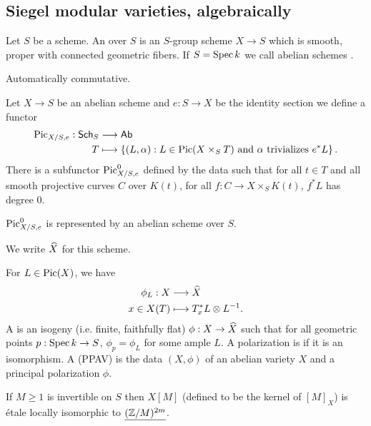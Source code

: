 \subsection{Siegel modular varieties, algebraically}
\begin{definition}
	Let $S$ be a scheme. An  over $S$ is an $S$-group scheme $X\to S$
	which is smooth, proper with connected geometric fibers. If $S=\operatorname{Spec} k$ we call abelian
	schemes .
\end{definition}
\begin{proposition}
	Automatically commutative.
\end{proposition}
\begin{definition}
	Let $X\to S$ be an abelian scheme and $e:S\to X$ be the identity section we define a functor
	\begin{align*}
		\operatorname{Pic}_{X /S,e}: \mathsf{Sch}_{S} &\longrightarrow \mathsf{Ab} \\
		T &\longmapsto \left\{ (L,\alpha): L\in \operatorname{Pic}(X\times_S T)\text{ and }\alpha \text{
		trivializes }e^{*}L \right\} .
	\end{align*}
	There is a subfunctor $\operatorname{Pic}_{X /S,e}^{0}$ defined by the data such that for all $t\in T$
	and all smooth projective curves $C$ over $K(t)$, for all $f:C\to X\times_S K(t)$,
	$f^{*}L$ has degree 0.
\end{definition}
\begin{theorem}
	$\operatorname{Pic}^{0}_{X /S,e}$ is represented by an abelian scheme over $S$.
\end{theorem}
We write $\widehat{X}$ for this scheme.
\begin{definition}
	For $L\in \operatorname{Pic}(X)$, we have
	\begin{align*}
		\phi_L: X &\longrightarrow \widehat{X} \\
		x\in X(T) &\longmapsto T_x^{*}L\otimes L^{-1}.
	\end{align*}
	A  is an isogeny (i.e. finite, faithfully flat) $\phi:X\to \wh{X}$
	such that for all geometric points $p:\Spec k\to S$, $\phi_p=\phi_L$ for some ample $L$.
	A polarization is  if it is an isomorphism. A  (PPAV) is the data $(X,\phi)$ of an abelian variety $X$ and a
	principal polarization $\phi$.
\end{definition}
\begin{proposition}
	If $M\ge 1$ is invertible on $S$ then $X[M]$ (defined to be the kernel of $[M]_X$) is
	\'etale locally isomorphic to $\underline{(\mathbb Z /M)^{2m}}$.
\end{proposition}
